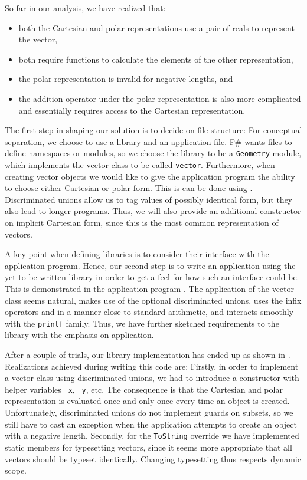 So far in our analysis, we have realized that:
\begin{itemize}
\item both the Cartesian and polar representations use a pair of reals to represent the vector, 
\item both require functions to calculate the elements of the other representation, 
\item the polar representation is invalid for negative lengths, and
\item the addition operator under the polar representation is also more complicated and essentially requires access to the Cartesian representation.
\end{itemize}
 

The first step in shaping our solution is to decide on file structure: For conceptual separation, we choose to use a library and an application file. F\# wants files to define namespaces or modules, so we choose the library to be a \lstinline{Geometry} module, which implements the vector class to be called \lstinline{vector}. Furthermore, when creating vector objects we would like to give the application program the ability to choose either Cartesian or polar form. This is can be done using . Discriminated unions allow us to tag values of possibly identical form, but they also lead to longer programs. Thus, we will also provide an additional constructor on implicit Cartesian form, since this is the most common representation of vectors.

A key point when defining libraries is to consider their interface with the application program. Hence, our second step is to write an application using the yet to be written library in order to get a feel for how such an interface could be. This is demonstrated in the application program .
%
%
The application of the vector class seems natural, makes use of the optional discriminated unions, uses the infix operators \lexeme{+} and \lexeme{*} in a manner close to standard arithmetic, and interacts smoothly with the \lstinline{printf} family. Thus, we have further sketched requirements to the library with the emphasis on application.

After a couple of trials, our library implementation has ended up as shown in .
%
%
Realizations achieved during writing this code are: Firstly, in order to implement a vector class using discriminated unions, we had to introduce a constructor with helper variables \lstinline{_x}, \lstinline{_y}, etc. The consequence is that the Cartesian and polar representation is evaluated once and only once every time an object is created. Unfortunately, discriminated unions do not implement guards on subsets, so we still have to cast an exception when the application attempts to create an object with a negative length. Secondly, for the \lstinline{ToString} override we have implemented static members for typesetting vectors, since it seems more appropriate that all vectors should be typeset identically. Changing typesetting thus respects dynamic scope.

